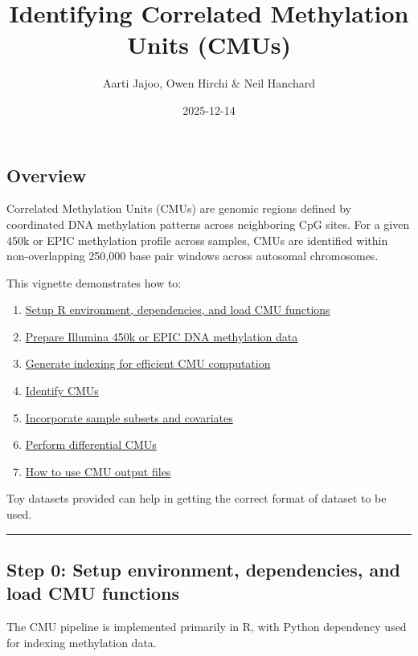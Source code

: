 \documentclass[
]{article}
\title{Identifying Correlated Methylation Units (CMUs)}
\author{Aarti Jajoo, Owen Hirchi \& Neil Hanchard}
\date{2025-12-14}
\providecommand{\tightlist}{%
  \setlength{\itemsep}{0pt}\setlength{\parskip}{0pt}}
\begin{document}
\maketitle

\subsection{Overview}\label{overview}

Correlated Methylation Units (CMUs) are genomic regions defined by
coordinated DNA methylation patterns across neighboring CpG sites. For a
given 450k or EPIC methylation profile across samples, CMUs are
identified within non-overlapping 250,000 base pair windows across
autosomal chromosomes.

This vignette demonstrates how to:

\begin{enumerate}
\def\labelenumi{\arabic{enumi}.}
\setcounter{enumi}{-1}
\tightlist
\item
  \hyperref[step0-setup]{Setup R environment, dependencies, and load CMU
  functions}
\item
  \hyperref[methylation-input-format]{Prepare Illumina 450k or EPIC DNA
  methylation data}
\item
  \hyperref[step2-indexing]{Generate indexing for efficient CMU
  computation}
\item
  \hyperref[step3-CMU-calling]{Identify CMUs}
\item
  \hyperref[step4-adj_cov]{Incorporate sample subsets and covariates}
\item
  \hyperref[step5-diffCMU]{Perform differential CMUs}
\item
  \hyperref[cmuOutput]{How to use CMU output files}
\end{enumerate}

Toy datasets provided can help in getting the correct format of dataset
to be used.

\begin{center}\rule{0.5\linewidth}{0.5pt}\end{center}

\subsection{Step 0: Setup environment, dependencies, and load CMU
functions}\label{step0-setup}

The CMU pipeline is implemented primarily in R, with Python dependency
used for indexing methylation data.
\end{document}
